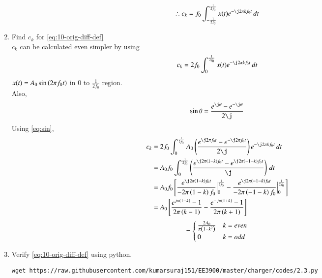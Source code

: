\documentclass[journal,12pt,twocolumn]{IEEEtran}
\renewcommand\thesection{\arabic{section}}
\begin{document}
\begin{enumerate}[label=\thesection.\arabic*,ref=\thesection.\theenumi]
\begin{align}
  \therefore c_k = f_0\int_{-\frac{1}{2f_0}}^{\frac{1}{2f_0}}x(t)e^{-\j2\pi kf_0 t}\, dt
    \end{align}
	\item Find $c_k$ for 
	\eqref{eq:10-orig-diff-def}\\
	\solution
	$c_k$ can be calculated even simpler by using
	\begin{align}
	c_k = 2f_0\int_{0}^{\frac{1}{2f_0}}x(t)e^{- \j2 \pi kf_0 t}\, dt
	\end{align}
	$x(t)=A_0 \sin\left(2 \pi f_0t\right)$ in 0 to $\frac{1}{2f_0}$ region.\\
Also,
	\begin{align}
	\label{eq:sin}
 \sin \theta  =\frac{e^{\j\theta}-e^{-\j \theta}}{2\j} 
  \end{align}
  Using \eqref{eq:sin},
  \begin{align}
  c_k &= 2f_0\int_{0}^{\frac{1}{2f_0}}A_0 \brak{\frac{e^{\j2\pi f_0t}-e^{-\j 2\pi f_0t}}{2\j}} e^{- \j2 \pi kf_0 t}\,dt\\
  &=A_0f_0\int_{0}^{\frac{1}{2f_0}} \brak{\frac{e^{\j2\pi\brak{1-k} f_0t}-e^{\j 2\pi\brak{-1-k} f_0t}}{\j}}\,dt\\
&=A_0f_0\sbrak{\frac{e^{\j2\pi\brak{1-k} f_0t}}{-2\pi \brak{1-k}f_0}\Big|_0^{\frac{1}{2f_0}} - \frac{e^{\j2\pi\brak{-1-k} f_0t}}{-2\pi \brak{-1-k}f_0}\Big|_0^{\frac{1}{2f_0}}}\\
&=A_0\sbrak{\frac{e^{j\pi\brak{1-k}}-1}{2\pi\brak{k-1}}-\frac{e^{-j\pi\brak{1+k}}-1}{2\pi\brak{k+1}}}
  \end{align}
  \begin{equation}
  \label{eq:ck}
 = \begin{cases}
\frac{2A_0}{\pi\left(1-k^2\right)}&k=even
\\
0&k=odd
\end{cases}
  \end{equation}
\item Verify 
	\eqref{eq:10-orig-diff-def}
	using python.\\
	\solution
\begin{lstlisting}
wget https://raw.githubusercontent.com/kumarsuraj151/EE3900/master/charger/codes/2.3.py 
\end{lstlisting}
\begin{figure}[!ht]
	\centering

\end{figure}
\end{enumerate}
\end{document}
